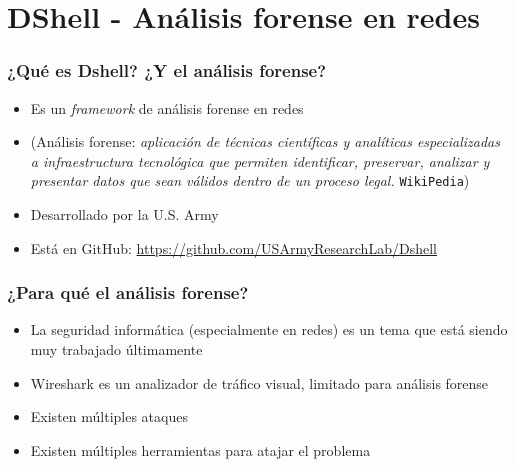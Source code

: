 \section{DShell - Análisis forense en redes}


\begin{frame}
\frametitle{¿Qué es Dshell? ¿Y el análisis forense?}

\begin{itemize}
   \item Es un \emph{framework} de análisis forense en redes
   \item (Análisis forense: \emph {aplicación de técnicas científicas y analíticas especializadas a infraestructura tecnológica que permiten identificar, preservar, analizar y presentar datos que sean válidos dentro de un proceso legal.} \texttt{WikiPedia})
   \item Desarrollado por la U.S. Army
   \item Está en GitHub: \url{https://github.com/USArmyResearchLab/Dshell}
\end{itemize}

\end{frame}



\begin{frame}
\frametitle{¿Para qué el análisis forense?}

\begin{itemize}
   \item La seguridad informática (especialmente en redes) es un tema que está siendo muy trabajado últimamente
   \item Wireshark es un analizador de tráfico visual, limitado para análisis forense
   \item Existen múltiples ataques
   \item Existen múltiples herramientas para atajar el problema
\end{itemize}

\end{frame}


